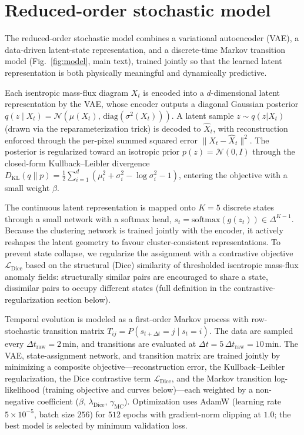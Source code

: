 \documentclass[11pt]{article}
\begin{document}
\section{Reduced-order stochastic model}

The reduced-order stochastic model combines a variational autoencoder (VAE), a data-driven latent-state representation, and a discrete-time Markov transition model (Fig.~\ref{fig:model}, main text), trained jointly so that the learned latent representation is both physically meaningful and dynamically predictive.

Each isentropic mass-flux diagram $X_t$ is encoded into a $d$-dimensional latent representation by the VAE, whose encoder outputs a diagonal Gaussian posterior $q(z \mid X_t) = \mathcal{N}(\mu(X_t),\,\mathrm{diag}(\sigma^2(X_t)))$. A latent sample $z\sim q(z|X_t)$ (drawn via the reparameterization trick) is decoded to $\hat{X}_t$, with reconstruction enforced through the per-pixel summed squared error $\|X_t-\hat{X}_t\|^2$. The posterior is regularized toward an isotropic prior $p(z)=\mathcal{N}(0,I)$ through the closed-form Kullback--Leibler divergence $D_{\mathrm{KL}}(q\|p) = \tfrac{1}{2}\sum_{i=1}^d(\mu_i^2+\sigma_i^2-\log\sigma_i^2-1)$, entering the objective with a small weight $\beta$.

The continuous latent representation is mapped onto $K=5$ discrete states through a small network with a softmax head, $s_t = \mathrm{softmax}(g(z_t)) \in \Delta^{K-1}$. Because the clustering network is trained jointly with the encoder, it actively reshapes the latent geometry to favour cluster-consistent representations. To prevent state collapse, we regularize the assignment with a contrastive objective $\mathcal{L}_{\mathrm{Dice}}$ based on the structural (Dice) similarity of thresholded isentropic mass-flux anomaly fields: structurally similar pairs are encouraged to share a state, dissimilar pairs to occupy different states (full definition in the contrastive-regularization section below).

Temporal evolution is modeled as a first-order Markov process with row-stochastic transition matrix $T_{ij} = P(s_{t+\Delta t} = j \mid s_t = i)$. The data are sampled every $\Delta t_\text{raw}=2\,\mathrm{min}$, and transitions are evaluated at $\Delta t = 5\,\Delta t_\text{raw} = 10\,\mathrm{min}$. The VAE, state-assignment network, and transition matrix are trained jointly by minimizing a composite objective---reconstruction error, the Kullback--Leibler regularization, the Dice contrastive term $\mathcal{L}_{\mathrm{Dice}}$, and the Markov transition log-likelihood (training objective and curves below)---each weighted by a non-negative coefficient ($\beta$, $\lambda_{\mathrm{Dice}}$, $\gamma_{\mathrm{MC}}$). Optimization uses AdamW (learning rate $5\times10^{-5}$, batch size $256$) for $512$ epochs with gradient-norm clipping at $1.0$; the best model is selected by minimum validation loss.
\end{document}
